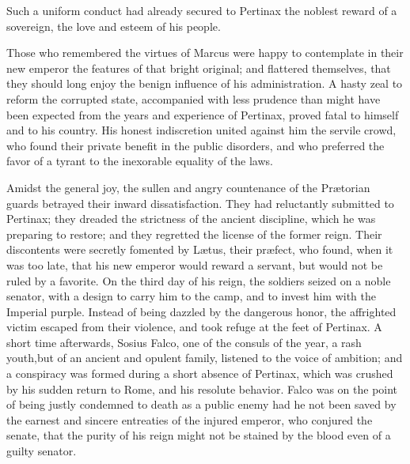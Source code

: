 
Such a uniform conduct had already secured to Pertinax the
noblest reward of a sovereign, the love and esteem of his people.

Those who remembered the virtues of Marcus were happy to
contemplate in their new emperor the features of that bright
original; and flattered themselves, that they should long enjoy
the benign influence of his administration. A hasty zeal to
reform the corrupted state, accompanied with less prudence than
might have been expected from the years and experience of
Pertinax, proved fatal to himself and to his country. His honest
indiscretion united against him the servile crowd, who found
their private benefit in the public disorders, and who preferred
the favor of a tyrant to the inexorable equality of the laws.\footnotemark[53]


Amidst the general joy, the sullen and angry countenance of the
Prætorian guards betrayed their inward dissatisfaction. They had
reluctantly submitted to Pertinax; they dreaded the strictness of
the ancient discipline, which he was preparing to restore; and
they regretted the license of the former reign. Their discontents
were secretly fomented by Lætus, their præfect, who found, when
it was too late, that his new emperor would reward a servant, but
would not be ruled by a favorite. On the third day of his reign,
the soldiers seized on a noble senator, with a design to carry
him to the camp, and to invest him with the Imperial purple.
Instead of being dazzled by the dangerous honor, the affrighted
victim escaped from their violence, and took refuge at the feet
of Pertinax. A short time afterwards, Sosius Falco, one of the
consuls of the year, a rash youth,\footnotemark[54] but of an ancient and
opulent family, listened to the voice of ambition; and a
conspiracy was formed during a short absence of Pertinax, which
was crushed by his sudden return to Rome, and his resolute
behavior. Falco was on the point of being justly condemned to
death as a public enemy had he not been saved by the earnest and
sincere entreaties of the injured emperor, who conjured the
senate, that the purity of his reign might not be stained by the
blood even of a guilty senator.


